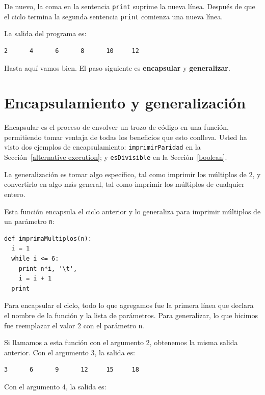 De nuevo, la coma en la sentencia  \texttt{print} suprime la nueva línea.
Después de que el ciclo termina la segunda sentencia \texttt{print} comienza
una nueva línea.

La salida del programa es:

\beforeverb
\begin{verbatim}
2      4      6      8      10     12
\end{verbatim}
\afterverb
%
Hasta aquí vamos bien. El paso siguiente es  {\bf encapsular} y {\bf generalizar}.


\section{Encapsulamiento y generalización}
\label{encapsulation}


Encapsular es el proceso de envolver un trozo de código en una 
función, permitiendo tomar ventaja de todas los beneficios que esto 
conlleva.  Usted ha visto dos ejemplos de encapsulamiento:
\texttt{imprimirParidad} en la Sección~\ref{alternative execution}; y
\texttt{esDivisible} en la  Sección~\ref{boolean}.

La generalización es tomar algo específico, tal como imprimir los
múltiplos de 2, y  convertirlo en algo más general, tal como 
imprimir los múltiplos de cualquier entero.

Esta función encapsula el ciclo anterior y lo generaliza
para imprimir múltiplos de un parámetro \texttt{n}:

\beforeverb
\begin{verbatim}
def imprimaMultiplos(n):
  i = 1
  while i <= 6:
    print n*i, '\t',
    i = i + 1
  print
\end{verbatim}
\afterverb
%
Para encapsular el ciclo, todo lo que agregamos fue la primera
línea que declara el nombre de la función y la lista de parámetros.
Para generalizar, lo que hicimos fue reemplazar el valor 2 con
el parámetro \texttt{n}.

Si llamamos a esta función con el argumento 2, obtenemos la misma
salida anterior. Con el argumento 3, la salida es:

\beforeverb
\begin{verbatim}
3      6      9      12     15     18
\end{verbatim}
\afterverb
%
Con el  argumento 4, la salida es:

